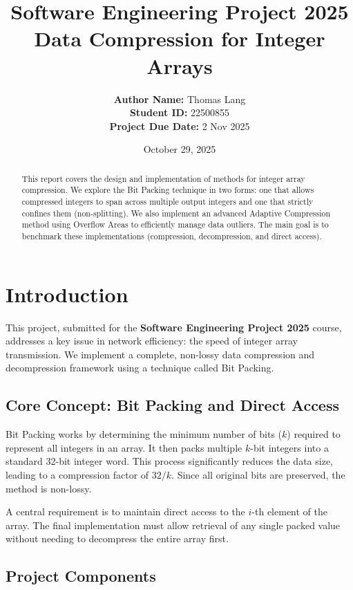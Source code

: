 \documentclass[11pt, a4paper]{article}
\title{\textbf{Software Engineering Project 2025} \\ Data Compression for Integer Arrays}
\author{
	\textbf{Author Name:} Thomas Lang \\
	\textbf{Student ID:} 22500855 \\
	\textbf{Project Due Date:} 2 Nov 2025
}
\date{October 29, 2025}
\begin{document}
	
	\maketitle
	\thispagestyle{empty} 
	
	\begin{abstract}
		This report covers the design and implementation of methods for integer array compression. We explore the Bit Packing technique in two forms: one that allows compressed integers to span across multiple output integers and one that strictly confines them (non-splitting). We also implement an advanced Adaptive Compression method using Overflow Areas to efficiently manage data outliers. The main goal is to benchmark these implementations (compression, decompression, and direct access).
	\end{abstract}
	
	\clearpage
	\tableofcontents
	\clearpage
	
	
	\section{Introduction}
	This project, submitted for the \textbf{Software Engineering Project 2025} course, addresses a key issue in network efficiency: the speed of integer array transmission. We implement a complete, non-lossy data compression and decompression framework using a technique called Bit Packing.
	
	\subsection{Core Concept: Bit Packing and Direct Access}
	
	Bit Packing works by determining the minimum number of bits ($k$) required to represent all integers in an array. It then packs multiple $k$-bit integers into a standard 32-bit integer word. This process significantly reduces the data size, leading to a compression factor of $32/k$. Since all original bits are preserved, the method is non-lossy.
	
	A central requirement is to maintain direct access to the $i$-th element of the array. The final implementation must allow retrieval of any single packed value without needing to decompress the entire array first.
	
	\subsection{Project Components}
	
\end{document}
